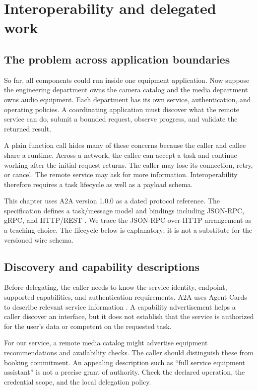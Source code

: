 \chapter{Interoperability and delegated work}
\section{The problem across application boundaries}
So far, all components could run inside one equipment application. Now suppose the engineering department owns the camera catalog and the media department owns audio equipment. Each department has its own service, authentication, and operating policies. A coordinating application must discover what the remote service can do, submit a bounded request, observe progress, and validate the returned result.

A plain function call hides many of these concerns because the caller and callee share a runtime. Across a network, the callee can accept a task and continue working after the initial request returns. The caller may lose its connection, retry, or cancel. The remote service may ask for more information. Interoperability therefore requires a task lifecycle as well as a payload schema.

This chapter uses A2A version 1.0.0 as a dated protocol reference. The specification defines a task/message model and bindings including JSON-RPC, gRPC, and HTTP/REST \cite{a2a}. We trace the JSON-RPC-over-HTTP arrangement as a teaching choice. The lifecycle below is explanatory; it is not a substitute for the versioned wire schema.

\section{Discovery and capability descriptions}
Before delegating, the caller needs to know the service identity, endpoint, supported capabilities, and authentication requirements. A2A uses Agent Cards to describe relevant service information \cite{a2a}. A capability advertisement helps a caller discover an interface, but it does not establish that the service is authorized for the user's data or competent on the requested task.

For our service, a remote media catalog might advertise equipment recommendations and availability checks. The caller should distinguish these from booking commitment. An appealing description such as “full service equipment assistant” is not a precise grant of authority. Check the declared operation, the credential scope, and the local delegation policy.

